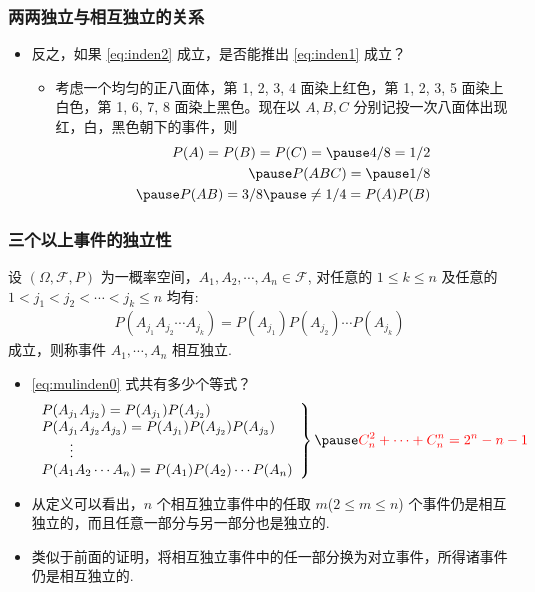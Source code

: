		\begin{frame}
			\frametitle{两两独立与相互独立的关系}
			\begin{itemize}[<+-|alert@+>]
		\item 反之，如果 \eqref{eq:inden2} 成立，是否能推出 \eqref{eq:inden1} 成立？
		\begin{itemize}[<+-|alert@+>]
			\item 考虑一个均匀的正八面体，第 1, 2, 3, 4 面染上红色，第 1, 2, 3, 5 面染上白色，第 1, 6, 7, 8 面染上黑色。现在以 $A,B,C$ 分别记投一次八面体出现红，白，黑色朝下的事件，则 \pause
			\begin{eqnarray*}
				P(A)=P(B)=P(C)=\pause 4/8=1/2\\ \pause
				P(ABC)=\pause 1/8   \\ \pause
				P(AB)=3/8\pause \neq 1/4=P(A)P(B)
			\end{eqnarray*}
		\end{itemize}
	\end{itemize}
\end{frame}

\begin{frame}
	\frametitle{三个以上事件的独立性}
	\begin{defi}
		设 $(\Omega,\mathcal{F}, P)$ 为一概率空间，$A_1,A_2,\cdots,A_n\in\mathcal{F}$, 对任意的 $1\le k\le n$ 及任意的 $1< j_1<j_2<\cdots<j_k\leq n$ 均有:
		\begin{eqnarray}\label{eq:mulinden0}
			P(A_{j_1}A_{j_2}\cdots A_{j_k})=P(A_{j_1})P(A_{j_2})\cdots P(A_{j_k})
		\end{eqnarray}
		成立，则称事件 $A_1,\cdots, A_n$ 相互独立.
	\end{defi}
	\pause
	\begin{itemize}[<+-|alert@+>]
		\item \eqref{eq:mulinden0} 式共有多少个等式？\pause
		\begin{eqnarray}
			\label{eq:mulinden}
			\left.\begin{array}{l}
				P(A_{j_1}A_{j_2})=P(A_{j_1})P(A_{j_2})\\
				P(A_{j_1}A_{j_2}A_{j_3})=P(A_{j_1})P(A_{j_2})P(A_{j_3}) \\
				\qquad \vdots\\
				P(A_1A_2\cdots A_n)=P(A_1)P(A_2)\cdots P(A_n)
			\end{array}\right\} \pause \textcolor{red}{C_n^2+\cdots+C_n^n=2^n-n-1}
		\end{eqnarray}
		\pause
		\item 从定义可以看出，$n$ 个相互独立事件中的任取 $m$($2\le m\le n$) 个事件仍是相互独立的，而且任意一部分与另一部分也是独立的.
		\item 类似于前面的证明，将相互独立事件中的任一部分换为对立事件，所得诸事件仍是相互独立的.
	\end{itemize}



\end{frame}

